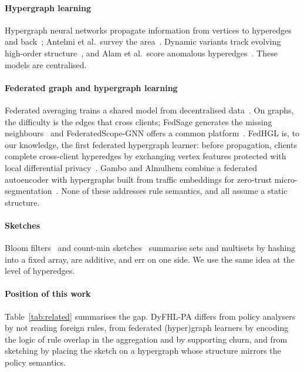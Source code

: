 \documentclass[preprint,12pt]{elsarticle}
\theoremstyle{definition}
\newcommand{\name}{DyFHL-PA\xspace}
\begin{document}
\paragraph{Hypergraph learning}
Hypergraph neural networks propagate information from vertices to hyperedges and back~\cite{feng2019hgnn,yadati2019hypergcn,bai2021hypergraph,gao2023hgnnplus}; Antelmi et al.\ survey the area~\cite{antelmi2023survey}. Dynamic variants track evolving high-order structure~\cite{yin2022dyhcn,ko2025lincoln}, and Alam et al.\ score anomalous hyperedges~\cite{alam2024hyperedge}. These models are centralised.

\paragraph{Federated graph and hypergraph learning}
Federated averaging trains a shared model from decentralised data~\cite{mcmahan2017communication,kairouz2021advances}. On graphs, the difficulty is the edges that cross clients; FedSage generates the missing neighbours~\cite{zhang2021subgraph} and FederatedScope-GNN offers a common platform~\cite{wang2022federatedscope}. FedHGL is, to our knowledge, the first federated hypergraph learner: before propagation, clients complete cross-client hyperedges by exchanging vertex features protected with local differential privacy~\cite{luo2024fedhgl}. Gambo and Almulhem combine a federated autoencoder with hypergraphs built from traffic embeddings for zero-trust micro-segmentation~\cite{gambo2026efah}. None of these addresses rule semantics, and all assume a static structure.

\paragraph{Sketches}
Bloom filters~\cite{bloom1970space} and count-min sketches~\cite{cormode2005countmin} summarise sets and multisets by hashing into a fixed array, are additive, and err on one side. We use the same idea at the level of hyperedges.

\paragraph{Position of this work}
Table~\ref{tab:related} summarises the gap. \name differs from policy analysers by not reading foreign rules, from federated (hyper)graph learners by encoding the logic of rule overlap in the aggregation and by supporting churn, and from sketching by placing the sketch on a hypergraph whose structure mirrors the policy semantics.
\end{document}

